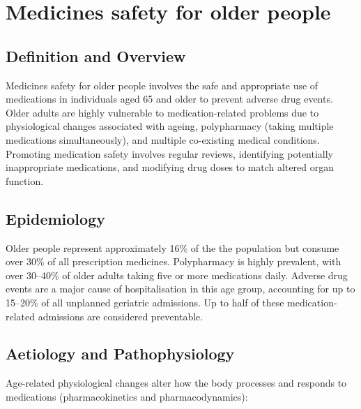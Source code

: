 \chapter{Medicines safety for older people}

\section*{Definition and Overview}
Medicines safety for older people involves the safe and appropriate use of medications in individuals aged 65 and older to prevent adverse drug events. Older adults are highly vulnerable to medication-related problems due to physiological changes associated with ageing, polypharmacy (taking multiple medications simultaneously), and multiple co-existing medical conditions. Promoting medication safety involves regular reviews, identifying potentially inappropriate medications, and modifying drug doses to match altered organ function.

\section*{Epidemiology}
Older people represent approximately 16\% of the the population but consume over 30\% of all prescription medicines. Polypharmacy is highly prevalent, with over 30--40\% of older adults taking five or more medications daily. Adverse drug events are a major cause of hospitalisation in this age group, accounting for up to 15--20\% of all unplanned geriatric admissions. Up to half of these medication-related admissions are considered preventable.

\section*{Aetiology and Pathophysiology}
Age-related physiological changes alter how the body processes and responds to medications (pharmacokinetics and pharmacodynamics):

